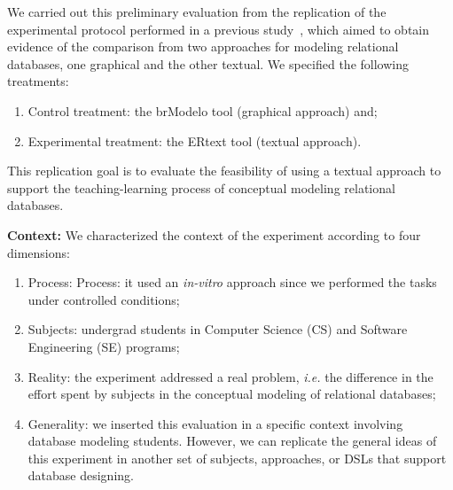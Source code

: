 We carried out this preliminary evaluation from the replication of the experimental protocol performed in a previous study~\cite{Lopes:2019}, which aimed to obtain evidence of the comparison from two approaches for modeling relational databases, one graphical and the other textual.
We specified the following treatments:
\begin{enumerate} [label=\roman*.]
    \item Control treatment: the brModelo tool (graphical approach) and;
    \item Experimental treatment: the ERtext tool (textual approach).
\end{enumerate}
This replication goal is to evaluate the feasibility of using a textual approach to support the teaching-learning process of conceptual modeling relational databases.

\textbf{Context:}
We characterized the context of the experiment according to four dimensions:
\begin{enumerate}[label=\roman*.]
    \item Process: Process: it used an \textit{in-vitro} approach since we performed the tasks under controlled conditions;
    \item Subjects: undergrad students in Computer Science (CS) and Software Engineering (SE) programs;
    \item Reality: the experiment addressed a real problem, \textit{i.e.} the difference in the effort spent by subjects in the conceptual modeling of relational databases; 
    \item Generality: we inserted this evaluation in a specific context involving database modeling students.
    However, we can replicate the general ideas of this experiment in another set of subjects, approaches, or DSLs that support database designing. 
\end{enumerate}

